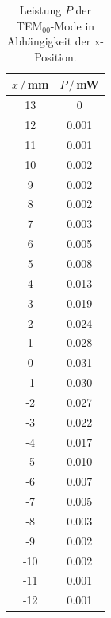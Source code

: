 \begin{table}
    \center
    \caption{Leistung $P$ der TEM$_{00}$-Mode in Abhängigkeit der x-Position.}
    \begin{tabular}{c c}
        \toprule
        $x\,/\,$mm & $P\,/\,$mW\\
        \midrule
        13&      0\\
        12&      0.001\\
        11&      0.001\\
        10&      0.002\\
        9 &      0.002\\
        8 &      0.002\\
        7 &      0.003\\
        6 &      0.005\\
        5 &      0.008\\
        4 &      0.013\\
        3 &      0.019\\
        2 &      0.024\\
        1 &      0.028\\
        0 &      0.031\\
        -1&      0.030\\
        -2&      0.027\\
        -3&      0.022\\
        -4&      0.017\\
        -5&      0.010\\
        -6&      0.007\\
        -7&      0.005\\
        -8&      0.003\\
        -9&      0.002\\
        -10&     0.002\\
        -11&     0.001\\
        -12&     0.001\\
        \bottomrule
    \end{tabular}
    \label{tab:TEM00}
\end{table}

